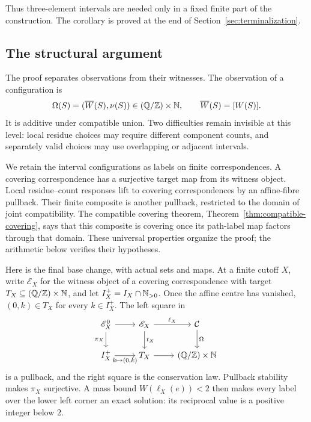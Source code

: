 Thus three-element intervals are needed only in a fixed finite part of the construction.  The corollary is proved at the end of Section~\ref{sec:terminalization}.

\subsection*{The structural argument}

The proof separates observations from their witnesses.  The observation of a configuration is
\[
\Omega(S)=(\overline W(S),\nu(S))\in (\mathbb Q/\mathbb Z)\times\mathbb N,
\qquad \overline W(S)=[W(S)].
\]
It is additive under compatible union.  Two difficulties remain invisible at this level: local residue choices may require different component counts, and separately valid choices may use overlapping or adjacent intervals.

We retain the interval configurations as labels on finite correspondences.  A covering correspondence has a surjective target map from its witness object.  Local residue--count responses lift to covering correspondences by an affine-fibre pullback.  Their finite composite is another pullback, restricted to the domain of joint compatibility.  The compatible covering theorem, Theorem~\ref{thm:compatible-covering}, says that this composite is covering once its path-label map factors through that domain.  These universal properties organize the proof; the arithmetic below verifies their hypotheses.

Here is the final base change, with actual sets and maps.  At a finite cutoff $X$, write $\mathscr E_X$ for the witness object of a covering correspondence with target $T_X\subseteq(\mathbb Q/\mathbb Z)\times\mathbb N$, and let $I_X^+=I_X\cap\mathbb N_{>0}$.  Once the affine centre has vanished, $(0,k)\in T_X$ for every $k\in I_X^+$.  The left square in
\begin{equation}\label{eq:master-proof-flow}
\begin{tikzcd}
\mathscr E_X^0 \arrow[r] \arrow[d,"{\pi_X}"']
  & \mathscr E_X \arrow[r,"{\ell_X}"] \arrow[d,"{t_X}"]
  & \mathcal C \arrow[d,"{\Omega}"]\\
I_X^+ \arrow[r,"{k\mapsto(0,k)}"']
  & T_X \arrow[r]
  & (\Q/\Z)\times\N
\end{tikzcd}
\end{equation}
is a pullback, and the right square is the conservation law.  Pullback stability makes $\pi_X$ surjective.  A mass bound $W(\ell_X(e))<2$ then makes every label over the lower left corner an exact solution: its reciprocal value is a positive integer below $2$.

